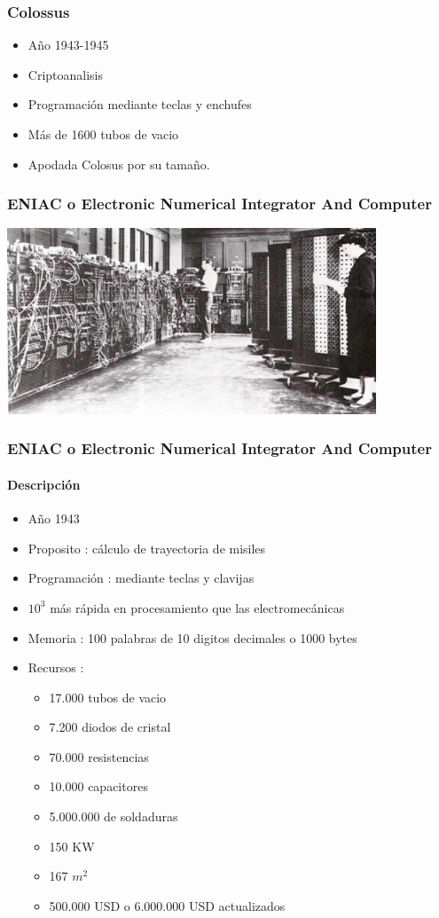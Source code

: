 \documentclass{beamer}
\begin{document}
\begin{frame}
\frametitle{Colossus}
\begin{itemize}
	\item Año 1943-1945
	\item Criptoanalisis
	\item Programación mediante teclas y enchufes
	\item Más de 1600 tubos de vacio
	\item Apodada Colosus por su tamaño.
\end{itemize}
\end{frame}

\begin{frame}
\frametitle{ENIAC o Electronic Numerical Integrator And Computer}
\begin{center}
	\includegraphics[width=11cm]{ENIAC.png}
\end{center}
\end{frame}

\begin{frame}
\frametitle{ENIAC o Electronic Numerical Integrator And Computer}
\framesubtitle{Descripción}
\begin{itemize}
	\item Año 1943
	\item Proposito : cálculo de trayectoria de misiles
	\item Programación : mediante teclas y clavijas
	\item $10^{3}$ más rápida en procesamiento que las electromecánicas
	\item Memoria : 100 palabras de 10 digitos decimales o 1000 bytes
	\item Recursos :
		\begin{itemize}
			\small
			\item 17.000 tubos de vacio
			\item 7.200 diodos de cristal
			\item 70.000 resistencias
			\item 10.000 capacitores
			\item 5.000.000 de soldaduras
			\item 150 KW
			\item 167 $m^{2}$
			\item 500.000 USD o 6.000.000 USD actualizados
		\end{itemize}
\end{itemize}
\end{frame}
\end{document}
